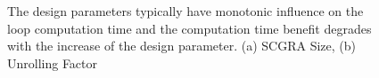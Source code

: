 \begin{figure}[tb]
    \caption{The design parameters typically have monotonic influence on the
        loop computation time and the computation time benefit degrades with 
        the increase of the design parameter. (a) SCGRA Size, (b) Unrolling Factor}
    \label{fig:observation}
  \end{figure}


%
%
